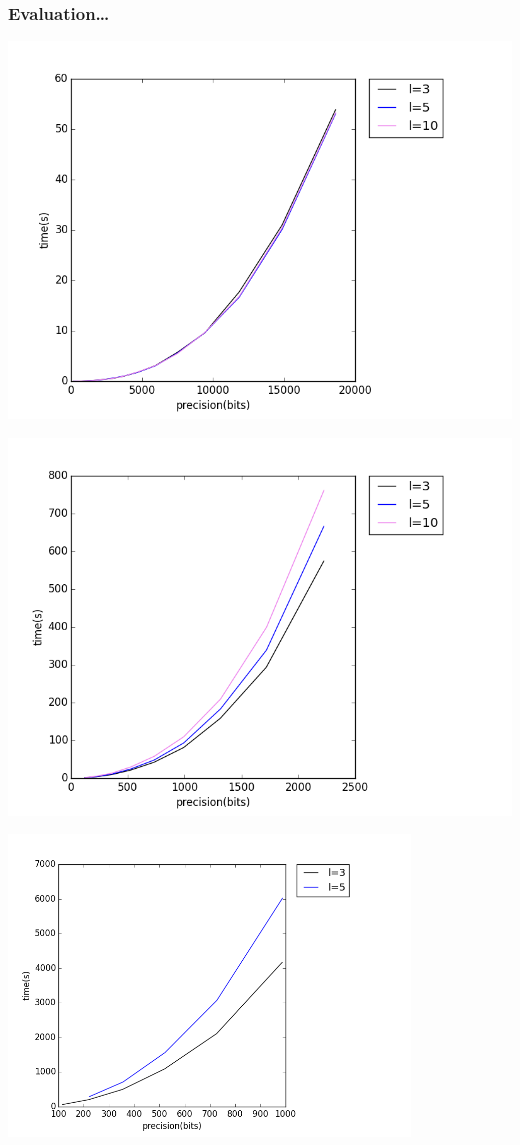 \begin{frame}
  \frametitle{Evaluation\dots}
  \begin{minipage}{0.48\textwidth}
  \includegraphics[width=1.2\textwidth]{time_0}
  \end{minipage}
  \begin{minipage}{0.48\textwidth}
  \includegraphics[width=1.2\textwidth]{time_1}
  \end{minipage}
\end{frame}
\begin{frame}
  \includegraphics[width=0.8\textwidth]{time_2}
\end{frame}
